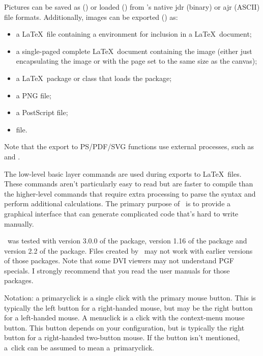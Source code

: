    Pictures can be saved as () or loaded
   () from \appname's native \gls{jdr}
   (binary) or \gls{ajr} (ASCII) file formats. Additionally, images can be
   exported () as:
   
   \begin{itemize}
    \item a \LaTeX\ file containing a  environment
    for inclusion in a \LaTeX\ document;

    \item a single-paged complete \LaTeX\ document containing the image
    (either just encapsulating the image or with the page set to the
    same size as the \gls{canvas});

    \item a \LaTeX\ package or class that loads the  package;

    \item a PNG file;

    \item a PostScript file;

    \item {} file.
   \end{itemize}

   Note that the export to PS/PDF/SVG functions use external
   processes, such as  and .
   
   The low-level  basic layer commands are used during
   exports to \LaTeX\ files. These commands aren't particularly easy to
   read but are faster to compile than the higher-level commands that
   require extra processing to parse the syntax and perform additional
   calculations. The primary purpose of \appname\ is to provide a
   graphical interface that can generate complicated code that's hard
   to write manually.

   \appname\ was tested with version 3.0.0 of the 
   package, version 1.16 of the  package and version
   2.2 of the  package. Files created by \appname\
   may not work with earlier versions of those packages. Note that some
   DVI viewers may not understand PGF specials. I strongly recommend
   that you read the user manuals for those packages.
   
   
   Notation: a \gls{primaryclick} is a single click with the primary
   mouse button. This is typically the left button for a right-handed
   mouse, but may be the right button for a left-handed mouse. A
   \gls{menuclick} is a click with the context-menu mouse button. This
   button depends on your configuration, but is typically the right
   button for a right-handed two-button mouse. If the button isn't
   mentioned, a~\gls{click} can be assumed to mean 
   a~\gls{primaryclick}.
   

